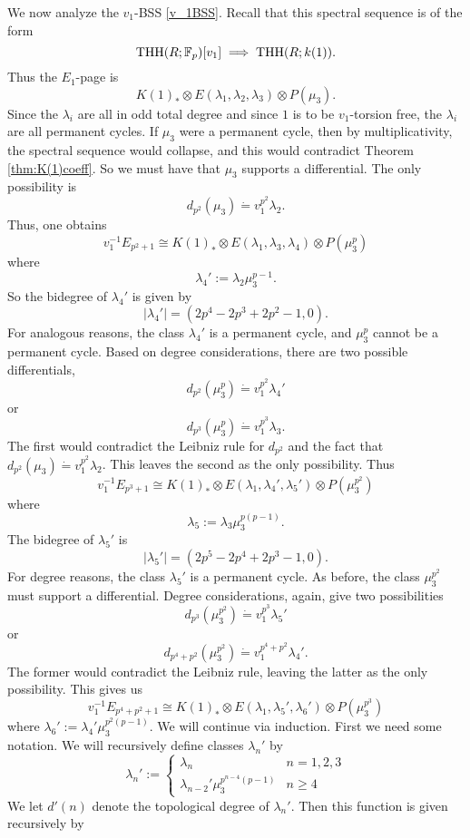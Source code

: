 We now analyze the $v_1$-BSS \eqref{v_1BSS}. Recall that this spectral sequence is of the form 
\[
\operatorname{THH}(R;\mathbb{F}_p)[v_1]\implies \operatorname{THH}(R;k(1)).
\]
Thus the $E_1$-page is 
\[
K(1)_*\otimes E(\lambda_1, \lambda_2, \lambda_3)\otimes P(\mu_3).
\]
Since the $\lambda_i$ are all in odd total degree and since $1$ is to be $v_1$-torsion free, the $\lambda_i$ are all permanent cycles. If $\mu_3$ were a permanent cycle, then by multiplicativity, the spectral sequence would collapse, and this would contradict Theorem \ref{thm:K(1)coeff}. So we must have that $\mu_3$ supports a differential. The only possibility is 
\[
d_{p^2}(\mu_3)\dot{=}v_1^{p^2}\lambda_2.
\]
Thus, one obtains
\[
v_1^{-1}E_{p^2+1}\cong K(1)_*\otimes E(\lambda_1, \lambda_3,\lambda_4)\otimes P(\mu_3^p)
\]
where 
\[
\lambda_4':= \lambda_2\mu_3^{p-1}.
\]
So the bidegree of $\lambda_4'$ is given by 
\[
|\lambda_4'|= (2p^4-2p^3+2p^2-1,0).
\]
For analogous reasons, the class $\lambda_4'$ is a permanent cycle, and $\mu_3^p$ cannot be a permanent cycle. Based on degree considerations, there are two possible differentials, 
\[
d_{p^2}(\mu_3^p)\dot{=} v_1^{p^2}\lambda_4'
\]
or 
\[
d_{p^3}(\mu_3^p)\dot{=}v_1^{p^3}\lambda_3.
\]
The first would contradict the Leibniz rule for $d_{p^2}$ and the fact that $d_{p^2}(\mu_3)\dot{=}v_1^{p^2}\lambda_2$. This leaves the second as the only possibility. Thus 
\[
v_1^{-1}E_{p^3+1}\cong K(1)_*\otimes E(\lambda_1, \lambda_4', \lambda_5')\otimes P(\mu_3^{p^2})
\]
where
\[
\lambda_5:= \lambda_3\mu_3^{p(p-1)} .
\]
The bidegree of $\lambda_5'$ is 
\[
|\lambda_5'|=(2p^5-2p^4+2p^3-1,0).
\]
For degree reasons, the class $\lambda_5'$ is a permanent cycle. As before, the class $\mu_3^{p^2}$ must support a differential. Degree considerations, again, give two possibilities
\[
d_{p^3}(\mu_3^{p^2})\dot{=}v_1^{p^3}\lambda_5'
\]
or 
\[
d_{p^4+p^2}(\mu_3^{p^2}) \dot{=} v_1^{p^4+p^2}\lambda_4'.
\]
The former would contradict the Leibniz rule, leaving the latter as the only possibility. This gives us
\[
v_1^{-1}E_{p^4+p^2+1}\cong K(1)_*\otimes E(\lambda_1, \lambda_5', \lambda_6')\otimes P(\mu_3^{p^3})
\]
where $\lambda_6':= \lambda_4'\mu_3^{p^2(p-1)}$. We will continue via induction. First we need some notation. We will recursively define classes $\lambda_n'$ by 
\[
\lambda_n':= \begin{cases}
	\lambda_n & n=1,2,3\\
	\lambda_{n-2}'\mu_3^{p^{n-4}(p-1)} & n\geq 4
\end{cases}
\]
We let $d'(n)$ denote the topological degree of $\lambda_n'$. Then this function is given recursively by 
